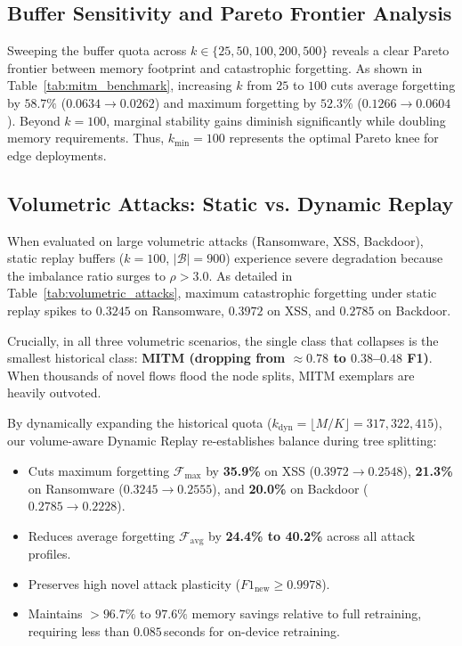 \documentclass[conference]{IEEEtran}
\begin{document}
\subsection{Buffer Sensitivity and Pareto Frontier Analysis}
Sweeping the buffer quota across $k \in \{25, 50, 100, 200, 500\}$ reveals a clear Pareto frontier between memory footprint and catastrophic forgetting. As shown in Table~\ref{tab:mitm_benchmark}, increasing $k$ from $25$ to $100$ cuts average forgetting by $58.7\%$ ($0.0634 \to 0.0262$) and maximum forgetting by $52.3\%$ ($0.1266 \to 0.0604$). Beyond $k=100$, marginal stability gains diminish significantly while doubling memory requirements. Thus, $k_{\min} = 100$ represents the optimal Pareto knee for edge deployments.

\subsection{Volumetric Attacks: Static vs. Dynamic Replay}
When evaluated on large volumetric attacks (Ransomware, XSS, Backdoor), static replay buffers ($k=100$, $|\mathcal{B}|=900$) experience severe degradation because the imbalance ratio surges to $\rho > 3.0$. As detailed in Table~\ref{tab:volumetric_attacks}, maximum catastrophic forgetting under static replay spikes to $0.3245$ on Ransomware, $0.3972$ on XSS, and $0.2785$ on Backdoor.

Crucially, in all three volumetric scenarios, the single class that collapses is the smallest historical class: \textbf{MITM (dropping from $\approx 0.78$ to $0.38$--$0.48$ F1)}. When thousands of novel flows flood the node splits, MITM exemplars are heavily outvoted.

By dynamically expanding the historical quota ($k_{\text{dyn}} = \lfloor M/K \rfloor = 317, 322, 415$), our volume-aware Dynamic Replay re-establishes balance during tree splitting:
\begin{itemize}
    \item Cuts maximum forgetting $\mathcal{F}_{\max}$ by \textbf{35.9\%} on XSS ($0.3972 \to 0.2548$), \textbf{21.3\%} on Ransomware ($0.3245 \to 0.2555$), and \textbf{20.0\%} on Backdoor ($0.2785 \to 0.2228$).
    \item Reduces average forgetting $\mathcal{F}_{\text{avg}}$ by \textbf{24.4\% to 40.2\%} across all attack profiles.
    \item Preserves high novel attack plasticity ($F1_{\text{new}} \ge 0.9978$).
    \item Maintains $>96.7\%$ to $97.6\%$ memory savings relative to full retraining, requiring less than $0.085$\,seconds for on-device retraining.
\end{itemize}
\end{document}
